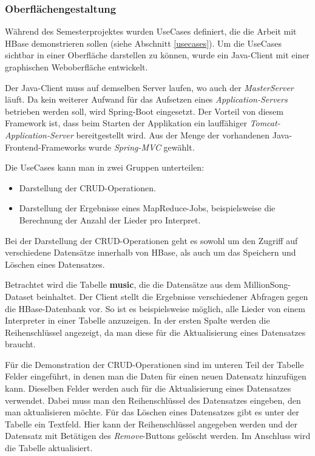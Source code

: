 \subsubsection{Oberflächengestaltung}

Während des Semesterprojektes wurden UseCases definiert, die die Arbeit mit  HBase demonstrieren sollen (siehe Abschnitt \ref{usecases}).
Um die UseCases sichtbar in einer Oberfläche darstellen zu können, wurde ein Java-Client mit einer graphischen Weboberfläche entwickelt.

Der Java-Client muss auf demselben Server laufen, wo auch der \textit{MasterServer} läuft. Da kein weiterer Aufwand für das Aufsetzen eines \textit{Application-Servers} betrieben werden soll, wird Spring-Boot eingesetzt. Der Vorteil von diesem Framework ist, dass beim Starten der Applikation ein lauffähiger \textit{Tomcat-Application-Server} bereitgestellt wird. 
Aus der Menge der vorhandenen Java-Frontend-Frameworks wurde \textit{Spring-MVC} gewählt.  

Die UseCases kann man in zwei Gruppen unterteilen:
\begin{itemize}
\item Darstellung der \ac{CRUD}-Operationen.
\item Darstellung der Ergebnisse eines MapReduce-Jobs, beispielsweise die Berechnung der Anzahl der Lieder pro Interpret.
\end{itemize}
Bei der Darstellung der \ac{CRUD}-Operationen geht es sowohl um den Zugriff auf verschiedene Datensätze innerhalb von HBase, als auch um das Speichern und Löschen eines Datensatzes.

Betrachtet wird die Tabelle \textbf{music}, die die Datensätze aus dem MillionSong-Dataset beinhaltet.
Der Client stellt die Ergebnisse verschiedener Abfragen gegen die HBase-Datenbank vor. So ist es beispielsweise möglich, alle Lieder von einem Interpreter in einer Tabelle anzuzeigen. In der ersten Spalte werden die Reihenschlüssel angezeigt, da man diese für die Aktualisierung eines Datensatzes braucht.

Für die Demonstration der \ac{CRUD}-Operationen sind im unteren Teil der Tabelle Felder eingeführt, in denen man die Daten für einen neuen Datensatz hinzufügen kann. Dieselben Felder werden auch für die Aktualisierung eines Datensatzes verwendet. Dabei muss man den Reihenschlüssel des Datensatzes eingeben, den man aktualisieren möchte.
Für das Löschen eines Datensatzes gibt es unter der Tabelle ein Textfeld. Hier kann der Reihenschlüssel angegeben werden und der Datensatz mit Betätigen des \textit{Remove}-Buttons gelöscht werden. Im Anschluss wird die Tabelle aktualisiert.

